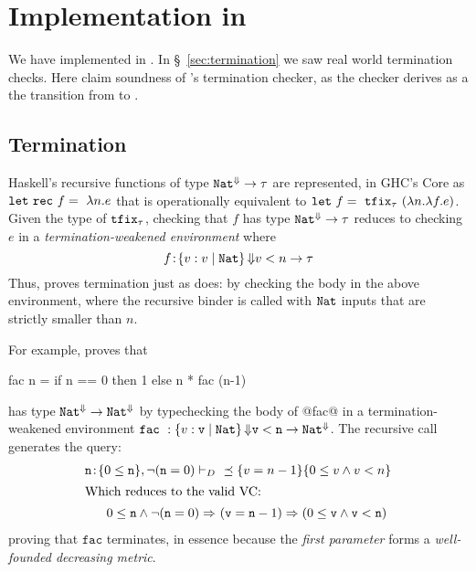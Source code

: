 
\newcommand\factyp{\typ}

\section{Implementation in \toolname}\label{sec:haskell}

We have implemented \declang in \toolname. 
% 
In \S~\ref{sec:termination} we saw real world termination checks.
%
Here claim soundness of \toolname's termination checker, 
as the checker derives as a the transition from \declang to \lhaskell.

\subsection{Termination}

Haskell's recursive functions of type ${{{\mathtt{Nat}}^{\Downarrow}} \rightarrow {\ensuremath{\tau}}}$ 
are represented, in GHC's Core \cite{SulzmannCJD07} as
${\mathtt{let\ rec}\ f = \ \lambda n. e}$ that is operationally
equivalent to ${\mathtt{let}\ f = \ \mathtt{tfix}_{\tau}\ (\lambda n. \lambda f. e)}$.
Given the type of $\mathtt{tfix}_{\tau}$, checking that $f$ has 
type ${{\mathtt{Nat}}^{\Downarrow}} \rightarrow {\ensuremath{\tau}}$ reduces to checking
$e$ in a \emph{termination-weakened environment} where
$${f\!:\!{\left\lbrace v : v\mid \mathtt{Nat}\right\rbrace{\ensuremath{\Downarrow}}{v < n}} \rightarrow {\ensuremath{\tau}}}$$
%
Thus, \toolname proves termination just as \declang 
does: by checking the body in the above environment, 
where the recursive binder is called with $\mathtt{Nat}$ 
inputs that are strictly smaller than $n$.

For example, \toolname proves that 
%
\begin{code}
  fac n = if n == 0 then 1 else n * fac (n-1)
\end{code}
%
has type ${{\mathtt{Nat}}^{\Downarrow}} \rightarrow {{\ensuremath{\mathtt{Nat}}}^{\ensuremath{\Downarrow}}}$ 
by typechecking the body of @fac@ 
in a termination-weakened environment 
${\mathtt{fac}\ : \tfunbasic{\tref{\ttv}{\tnat}{\finite}{\ttv < \ttn}}{\FinTy{\tnat}}}$.
The recursive call generates the query:
\begin{align*}
\tbind{\ttn}{\{0 \leq \ttn\}}, \lnot (\ttn = 0) \vdash_D &\  \subt{\ttref{v=n-1}}{\ttref{0 \leq v \wedge v < n}}\\ 
\intertext{Which reduces to the valid VC:}
0 \leq \ttn \wedge \lnot (\ttn = 0) \Rightarrow &\   (\ttv = \ttn-1) \Rightarrow (0 \leq \ttv \wedge \ttv < \ttn)
\end{align*}
%
proving that $\mathtt{fac}$ terminates, in essence because the
\emph{first parameter} forms a \emph{well-founded decreasing metric}.

